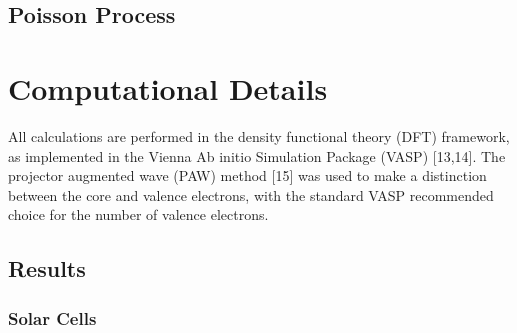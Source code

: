 \begin{refsection}
\section{Poisson Process} \label{sec:appendix-poisson} 
 
\chapter{Computational Details} \label{appendix:sec-computational} 
 
All calculations are performed in the density functional theory (DFT) 
framework, as implemented in the Vienna Ab initio Simulation Package (VASP) 
[13,14]. The projector augmented wave (PAW) method [15] was used to make a 
distinction between the core and valence electrons, with the standard VASP 
recommended choice for the number of valence electrons.  
 
\section{Results} \label{appendix:sec-results} 
 
\subsection{Solar Cells} \label{appendix:sec-solar} 
 

\end{refsection}
